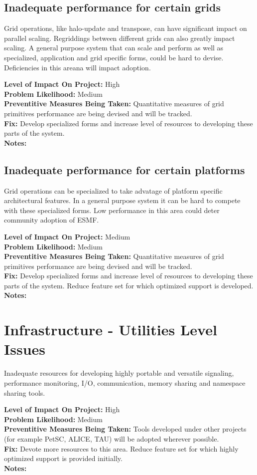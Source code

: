 \documentclass[english]{article}
\newcommand{\req}[1]{\section{\hspace{.2in}#1}}
\newcommand{\sreq}[1]{\subsection{\hspace{.2in}#1}}
\newenvironment
{reqlist}
{\begin{list} {} {} \rm \item[]}
{\end{list}}
\begin{document}
\sreq{Inadequate performance for certain grids}
Grid operations, like halo-update and transpose, can have significant impact on parallel scaling.
Regriddings between different grids can also greatly impact scaling.
A general purpose system that can scale and perform as well as specialized, application and
grid specific forms, could be hard to devise. Deficiencies in this areana will
impact adoption.
\begin{reqlist} 
{\bf Level of Impact On Project:} High \\ 
{\bf Problem Likelihood:} Medium \\
{\bf Preventitive Measures Being Taken:} Quantitative measures of grid primitives
performance are being devised and will be tracked.\\
{\bf Fix:} Develop specialized forms and increase level of resources
to developing these parts of the system.\\
{\bf Notes:} 
\end{reqlist}

\sreq{Inadequate performance for certain platforms}
Grid operations can be specialized to take advatage of platform specific
architectural features. In a general purpose system it can be hard to compete with these
specialized forms. Low performance in this area could deter community adoption of ESMF.
\begin{reqlist}
{\bf Level of Impact On Project:} Medium \\
{\bf Problem Likelihood:} Medium \\
{\bf Preventitive Measures Being Taken:} Quantitative measures of grid primitives
performance are being devised and will be tracked.\\
{\bf Fix:} Develop specialized forms and increase level of resources
to developing these parts of the system. Reduce feature set for which
optimized support is developed.
\\
{\bf Notes:} 
\end{reqlist}

\req{Infrastructure - Utilities Level Issues}
Inadequate resources for developing highly portable and versatile
signaling, performance monitoring, I/O, communication, memory sharing and namespace sharing tools.
\begin{reqlist}
{\bf Level of Impact On Project:} High \\
{\bf Problem Likelihood:} Medium \\
{\bf Preventitive Measures Being Taken:} Tools developed under other projects (for example PetSC, ALICE, TAU)
will be adopted wherever possible.
\\
{\bf Fix:} Devote more resources to this area. Reduce feature set for which
highly optimized support is provided initially. \\
{\bf Notes:} 
\end{reqlist}
\end{document}
